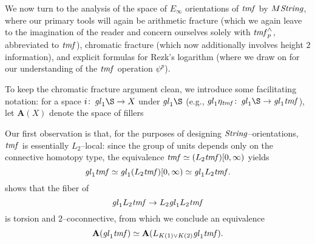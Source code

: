 We now turn to the analysis of the space of \(E_\infty\) orientations of \(\mathit{tmf}\) by \(M\mathit{String}\), where our primary tools will again be arithmetic fracture (which we again leave to the imagination of the reader and concern ourselves solely with \(\mathit{tmf}^\wedge_p\), abbreviated to \(\mathit{tmf}\)), chromatic fracture (which now additionally involves height \(2\) information), and explicit formulas for Rezk's logarithm (where we draw on  for our understanding of the \(\mathit{tmf}\) operation \(\psi^p\)).

To keep the chromatic fracture argument clean, we introduce some facilitating notation: for a space \(i\co \gl_1 \S \to X\) under \(\gl_1 \S\) (e.g., \(\gl_1 \eta_{\tmf}\co \gl_1 \S \to \gl_1 \tmf\)), let \(\mathbf A(X)\) denote the space of fillers
\begin{center}
\end{center}
Our first observation is that, for the purposes of designing \(\mathit{String}\)--orientations, \(\mathit{tmf}\) is essentially \(L_2\)--local: since the group of units depends only on the connective homotopy type, the equivalence \(\mathit{tmf} \simeq (L_2 \mathit{tmf}) [0, \infty)\) yields \[\mathit{gl}_1 \mathit{tmf} \simeq \mathit{gl}_1 (L_2 \mathit{tmf}) [0, \infty) \simeq \mathit{gl}_1 L_2 \mathit{tmf}.\]   shows that the fiber of \[\mathit{gl}_1 L_2 \mathit{tmf} \to L_2 \mathit{gl}_1 L_2 \mathit{tmf}\] is torsion and \(2\)--coconnective, from which we conclude an equivalence \[\mathbf A(\mathit{gl}_1 \mathit{tmf}) \simeq \mathbf A(L_{K(1) \vee K(2)} \mathit{gl}_1 \mathit{tmf}).\]

